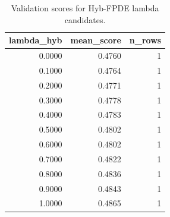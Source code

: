 \begin{table}[t]
\caption{Validation scores for Hyb-FPDE lambda candidates.}
\label{tab:lambda_distribution_computed}
\centering
\begin{tabular}{rrr}
\toprule
lambda\_hyb & mean\_score & n\_rows \\
\midrule
0.0000 & 0.4760 & 1 \\
0.1000 & 0.4764 & 1 \\
0.2000 & 0.4771 & 1 \\
0.3000 & 0.4778 & 1 \\
0.4000 & 0.4783 & 1 \\
0.5000 & 0.4802 & 1 \\
0.6000 & 0.4802 & 1 \\
0.7000 & 0.4822 & 1 \\
0.8000 & 0.4836 & 1 \\
0.9000 & 0.4843 & 1 \\
1.0000 & 0.4865 & 1 \\
\bottomrule
\end{tabular}

\end{table}
